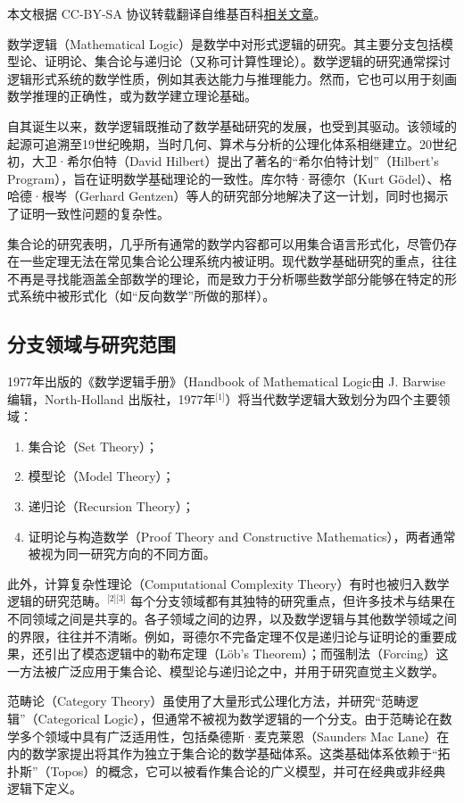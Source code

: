 
本文根据 CC-BY-SA 协议转载翻译自维基百科\href{https://en.wikipedia.org/wiki/Mathematical_logic}{相关文章}。

数学逻辑（Mathematical Logic）是数学中对形式逻辑的研究。其主要分支包括模型论、证明论、集合论与递归论（又称可计算性理论）。数学逻辑的研究通常探讨逻辑形式系统的数学性质，例如其表达能力与推理能力。然而，它也可以用于刻画数学推理的正确性，或为数学建立理论基础。

自其诞生以来，数学逻辑既推动了数学基础研究的发展，也受到其驱动。该领域的起源可追溯至19世纪晚期，当时几何、算术与分析的公理化体系相继建立。20世纪初，大卫·希尔伯特（David Hilbert）提出了著名的“希尔伯特计划”（Hilbert’s Program），旨在证明数学基础理论的一致性。库尔特·哥德尔（Kurt Gödel）、格哈德·根岑（Gerhard Gentzen）等人的研究部分地解决了这一计划，同时也揭示了证明一致性问题的复杂性。

集合论的研究表明，几乎所有通常的数学内容都可以用集合语言形式化，尽管仍存在一些定理无法在常见集合论公理系统内被证明。现代数学基础研究的重点，往往不再是寻找能涵盖全部数学的理论，而是致力于分析哪些数学部分能够在特定的形式系统中被形式化（如“反向数学”所做的那样）。
\subsection{分支领域与研究范围}
1977年出版的《数学逻辑手册》（Handbook of Mathematical Logic由 J. Barwise 编辑，North-Holland 出版社，1977年\(^\text{[1]}\)）将当代数学逻辑大致划分为四个主要领域：
\begin{enumerate}
  \item 集合论（Set Theory）；
  \item 模型论（Model Theory）；
  \item 递归论（Recursion Theory）；
  \item 证明论与构造数学（Proof Theory and Constructive Mathematics），两者通常被视为同一研究方向的不同方面。
\end{enumerate}
此外，计算复杂性理论（Computational Complexity Theory）有时也被归入数学逻辑的研究范畴。\(^\text{[2][3]}\)
每个分支领域都有其独特的研究重点，但许多技术与结果在不同领域之间是共享的。各子领域之间的边界，以及数学逻辑与其他数学领域之间的界限，往往并不清晰。例如，哥德尔不完备定理不仅是递归论与证明论的重要成果，还引出了模态逻辑中的勒布定理（Löb's Theorem）；而强制法（Forcing）这一方法被广泛应用于集合论、模型论与递归论之中，并用于研究直觉主义数学。

范畴论（Category Theory）虽使用了大量形式公理化方法，并研究“范畴逻辑”（Categorical Logic），但通常不被视为数学逻辑的一个分支。由于范畴论在数学多个领域中具有广泛适用性，包括桑德斯·麦克莱恩（Saunders Mac Lane）在内的数学家提出将其作为独立于集合论的数学基础体系。这类基础体系依赖于“拓扑斯”（Topos）的概念，它可以被看作集合论的广义模型，并可在经典或非经典逻辑下定义。

